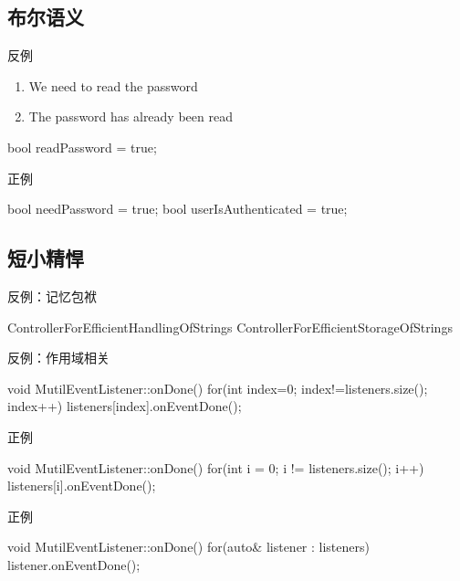 \subsection{布尔语义}

\begin{frame}[fragile]{反例}
\begin{enumerate}
  \item We need to read the password
  \item The password has already been read
\end{enumerate}

  \begin{c++}
bool readPassword = true;
  \end{c++}
\end{frame}

\begin{frame}[fragile]{正例}
  \begin{c++}
bool needPassword = true;
bool userIsAuthenticated = true;
  \end{c++}
\end{frame}

\subsection{短小精悍}

\begin{frame}[fragile]{反例：记忆包袱}
  \begin{c++}
ControllerForEfficientHandlingOfStrings
ControllerForEfficientStorageOfStrings
  \end{c++}
\end{frame}

\begin{frame}[fragile]{反例：作用域相关}
  \begin{c++}
void MutilEventListener::onDone() {
  for(int index=0; index!=listeners.size(); index++) {
    listeners[index].onEventDone();
  }
}
  \end{c++}
\end{frame}

\begin{frame}[fragile]{正例}
  \begin{c++}
void MutilEventListener::onDone() {
  for(int i = 0; i != listeners.size(); i++) {
    listeners[i].onEventDone();
  }
}
  \end{c++}
\end{frame}

\begin{frame}[fragile]{正例}
  \begin{c++}
void MutilEventListener::onDone() {
  for(auto& listener : listeners) {
    listener.onEventDone();
  }
}
  \end{c++}
\end{frame}

